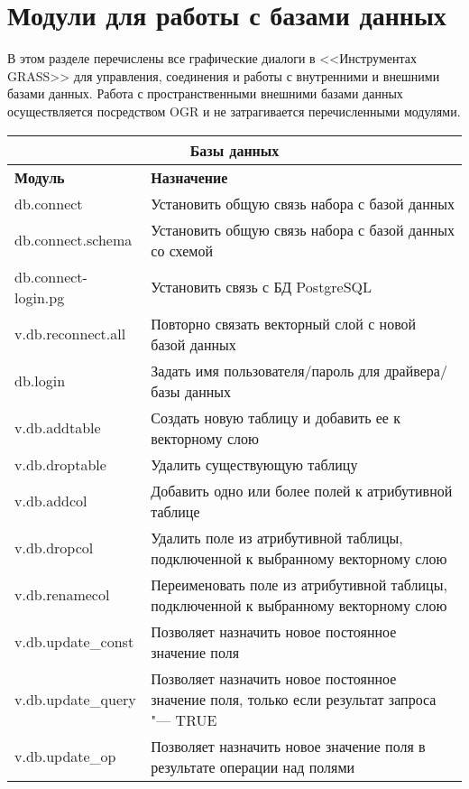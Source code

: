 \clearpage

\section{Модули для работы с базами данных}

В этом разделе перечислены все графические диалоги в <<Инструментах
GRASS>> для управления, соединения и работы с внутренними и внешними
базами данных. Работа с пространственными внешними базами данных
осуществляется посредством OGR и не затрагивается перечисленными модулями.

{\renewcommand{\arraystretch}{0.7}
\begin{table}[H]
\centering
 \begin{tabular}{|p{4cm}|p{10cm}|}
  \hline \multicolumn{2}{|c|}{\textbf{Базы данных}} \\
  \hline \textbf{Модуль} & \textbf{Назначение} \\
  \hline db.connect & Установить общую связь набора с базой данных \\
  \hline db.connect.schema & Установить общую связь набора с базой
  данных со схемой \\
  \hline db.connect-login.pg & Установить связь с БД PostgreSQL \\
  \hline v.db.reconnect.all & Повторно связать векторный слой с новой базой
  данных \\
  \hline db.login & Задать имя пользователя/пароль для драйвера/базы
  данных \\
  \hline v.db.addtable & Создать новую таблицу и добавить ее к
  векторному слою \\
  \hline v.db.droptable & Удалить существующую таблицу \\
  \hline v.db.addcol & Добавить одно или более полей к атрибутивной
  таблице \\
  \hline v.db.dropcol & Удалить поле из атрибутивной таблицы,
  подключенной к выбранному векторному слою \\
  \hline v.db.renamecol & Переименовать поле из атрибутивной таблицы,
  подключенной к выбранному векторному слою \\
  \hline v.db.update\_const & Позволяет назначить новое постоянное
  значение поля \\
  \hline v.db.update\_query & Позволяет назначить новое постоянное
  значение поля, только если результат запроса "--- TRUE \\
  \hline v.db.update\_op & Позволяет назначить новое значение поля в
  результате операции над полями \\

\end{tabular}
\end{table}}
